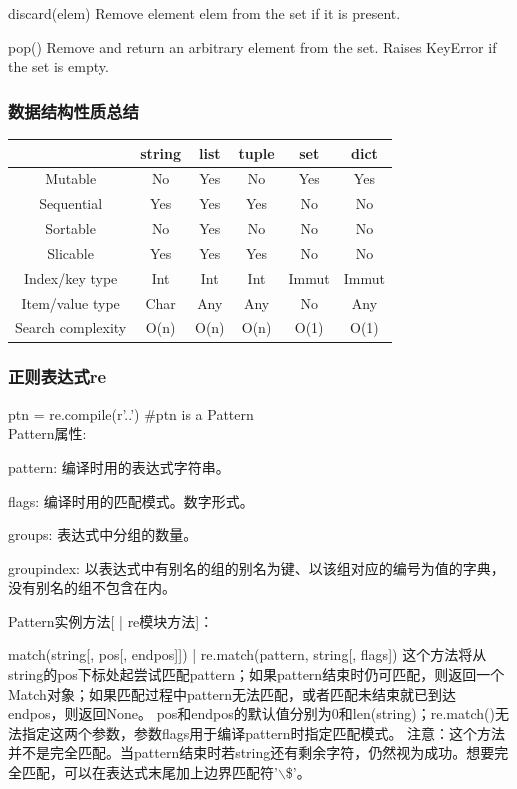 \documentclass[5pt,a4paper,twocolumn]{article}
\begin{document}
discard(elem)
Remove element elem from the set if it is present.

pop()
Remove and return an arbitrary element from the set. Raises KeyError if the set is empty.

\subsubsection*{数据结构性质总结}
\begin{table}[!hbp]
\begin{tabular}{ c c c c c c }
&string & list & tuple & set & dict\\
\hline
Mutable & No & Yes & No & Yes & Yes\\
\hline
Sequential & Yes & Yes & Yes & No & No\\
\hline
Sortable & No & Yes & No & No & No\\
\hline
Slicable & Yes & Yes & Yes & No & No\\
\hline
Index/key type & Int & Int & Int & Immut& Immut\\
\hline
Item/value type & Char & Any & Any & No & Any\\
\hline
Search complexity & O(n) & O(n) & O(n) & O(1) & O(1)\\
\hline
\end{tabular}
\end{table}

\subsubsection*{正则表达式re}

ptn = re.compile(r'..') \#ptn is a Pattern\\
Pattern属性:

pattern: 编译时用的表达式字符串。

flags: 编译时用的匹配模式。数字形式。

groups: 表达式中分组的数量。

groupindex: 以表达式中有别名的组的别名为键、以该组对应的编号为值的字典，没有别名的组不包含在内。

Pattern实例方法[ | re模块方法]：

match(string[, pos[, endpos]]) | re.match(pattern, string[, flags]) 
这个方法将从string的pos下标处起尝试匹配pattern；如果pattern结束时仍可匹配，则返回一个Match对象；如果匹配过程中pattern无法匹配，或者匹配未结束就已到达endpos，则返回None。 
pos和endpos的默认值分别为0和len(string)；re.match()无法指定这两个参数，参数flags用于编译pattern时指定匹配模式。 
注意：这个方法并不是完全匹配。当pattern结束时若string还有剩余字符，仍然视为成功。想要完全匹配，可以在表达式末尾加上边界匹配符'$\backslash$\$'。
\end{document}
